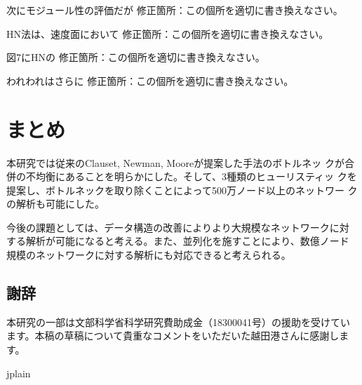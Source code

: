\documentclass [a4j,11pt] {jsarticle}
\begin{document}
\begin {空欄ブロック}{次にモジュール性の評価だが}
修正箇所：この個所を適切に書き換えなさい。
\end {空欄ブロック}

\begin {空欄ブロック}{HN法は、速度面において}
修正箇所：この個所を適切に書き換えなさい。
\end {空欄ブロック}

\begin {空欄ブロック}{図7にHNの}
修正箇所：この個所を適切に書き換えなさい。
\end {空欄ブロック}

\begin {空欄ブロック}{われわれはさらに}
修正箇所：この個所を適切に書き換えなさい。
\end {空欄ブロック}


\section {まとめ}
\label {sect: summary}

本研究では従来のClauset, Newman, Mooreが提案した手法のボトルネッ
クが合併の不均衡にあることを明らかにした。そして、3種類のヒューリスティッ
クを提案し、ボトルネックを取り除くことによって500万ノード以上のネットワー
クの解析も可能にした。

今後の課題としては、データ構造の改善によりより大規模なネットワークに対
する解析が可能になると考える。また、並列化を施すことにより、数億ノード
規模のネットワークに対する解析にも対応できると考えられる。

\subsection*{謝辞}

本研究の一部は文部科学省科学研究費助成金（18300041号）の援助を受けてい
ます。本稿の草稿について貴重なコメントをいただいた越田港さんに感謝しま
す。


 {jplain} %
\end{document}
